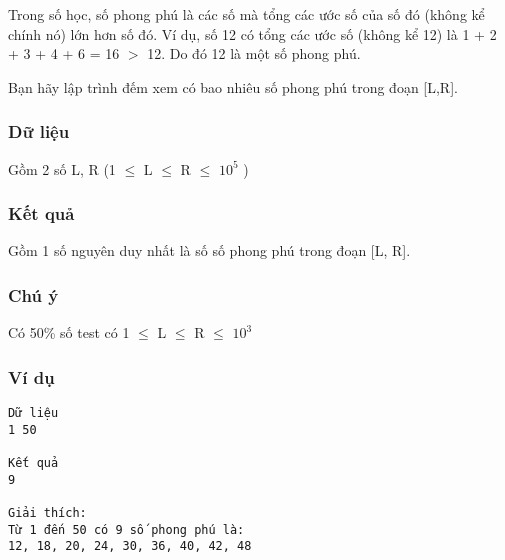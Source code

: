 



   Trong số học, số phong phú là các số mà tổng các ước số của số đó (không kể chính nó) lớn hơn số đó. Ví dụ, số 12 có tổng các ước số (không kể 12) là 1 + 2 + 3 + 4 + 6 = 16 $>$ 12. Do đó 12 là một số phong phú.  

   Bạn hãy lập trình đếm xem có bao nhiêu số phong phú trong đoạn [L,R].  

\subsubsection{   Dữ liệu  }

   Gồm 2 số L, R (1  $\le$  L  $\le$  R  $\le$  $10^{5}$   )  

\subsubsection{   Kết quả  }

   Gồm 1 số nguyên duy nhất là số số phong phú trong đoạn [L, R].  

\subsubsection{   Chú ý  }

   Có 50\% số test có 1  $\le$  L  $\le$  R  $\le$  $10^{3}$

\subsubsection{   Ví dụ  }
\begin{verbatim}
Dữ liệu
1 50

Kết quả
9

Giải thích:
Từ 1 đến 50 có 9 số phong phú là: 
12, 18, 20, 24, 30, 36, 40, 42, 48
\end{verbatim}

